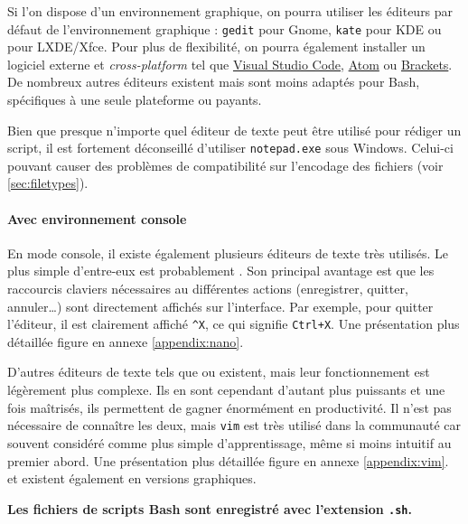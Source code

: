 Si l'on dispose d'un environnement graphique, on pourra utiliser les éditeurs par défaut de l'environnement graphique : \texttt{gedit} pour Gnome, \texttt{kate} pour KDE ou  pour LXDE/Xfce. \newline 
Pour plus de flexibilité, on pourra également installer un logiciel externe et \textit{cross-platform} tel que \href{https://code.visualstudio.com}{Visual Studio Code},  \href{https://atom.io}{Atom} ou \href{http://brackets.io}{Brackets}. De nombreux autres éditeurs existent mais sont moins adaptés pour Bash, spécifiques à une seule plateforme ou payants.

 Bien que presque n'importe quel éditeur de texte peut être utilisé pour rédiger un script, il est fortement déconseillé d'utiliser \texttt{notepad.exe} sous Windows. Celui-ci pouvant causer des problèmes de compatibilité sur l'encodage des fichiers (voir \ref{sec:filetypes}).

\paragraph{Avec environnement console}

En mode console, il existe également plusieurs éditeurs de texte très utilisés. Le plus simple d'entre-eux est probablement . Son principal avantage est que les raccourcis claviers nécessaires au différentes actions (enregistrer, quitter, annuler\dots) sont directement affichés sur l'interface. Par exemple, pour quitter l'éditeur, il est clairement affiché \texttt{\string^X}, ce qui signifie \texttt{Ctrl+X}. Une présentation plus détaillée figure en annexe \ref{appendix:nano}.

D'autres éditeurs de texte tels que  ou  existent, mais leur fonctionnement est légèrement plus complexe. Ils en sont cependant d'autant plus puissants et une fois maîtrisés, ils permettent de gagner énormément en productivité. Il n'est pas nécessaire de connaître les deux, mais \texttt{vim} est très utilisé dans la communauté car souvent considéré comme plus simple d'apprentissage, même si moins intuitif au premier abord. Une présentation plus détaillée figure en annexe \ref{appendix:vim}.  et  existent également en versions graphiques.

\begin{nscenter}
    \textbf{Les fichiers de scripts Bash sont enregistré avec l'extension \texttt{.sh}.}\vspace{-4mm}
\end{nscenter}

